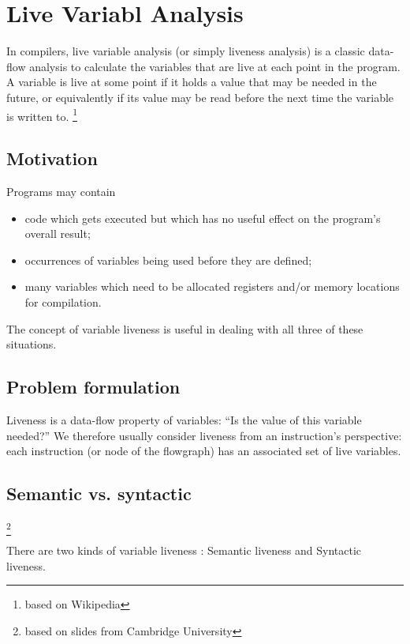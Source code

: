 \section{ Live Variabl Analysis   }

In compilers, live variable analysis (or simply liveness analysis)
 is a classic data-flow analysis to calculate the variables that 
 are live at each point in the program. A variable is live at 
 some point if it holds a value that may be needed in the future, 
 or equivalently if its value may be read before the next time 
 the variable is written to. \footnote{based on Wikipedia}

\subsection{Motivation}

Programs may contain 

\begin{itemize}
\item code which gets executed but which has no useful
effect on the program's overall result;
\item occurrences of variables being used before they
are defined;
\item many variables which need to be allocated
registers and/or memory locations for compilation.

\end{itemize}

The concept of variable liveness is useful in dealing 
with all three of these situations.



\subsection{Problem formulation}
Liveness is a data-flow property of variables:
“Is the value of this variable needed?” We therefore 
usually consider liveness from an instruction's 
perspective: each instruction (or node of the
flowgraph) has an associated set of live variables.


\subsection{Semantic vs. syntactic}

\footnote{based on slides from Cambridge University}


There are two kinds of variable liveness : Semantic liveness and Syntactic liveness.


